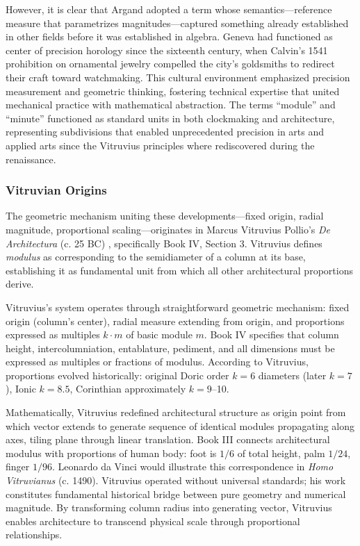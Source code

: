 However, it is clear that Argand adopted a term whose semantics—reference measure that parametrizes magnitudes—captured something already established in other fields before it was established in algebra. Geneva had functioned as center of precision horology since the sixteenth century, when Calvin's 1541 prohibition on ornamental jewelry compelled the city's goldsmiths to redirect their craft toward watchmaking. This cultural environment emphasized precision measurement and geometric thinking, fostering technical expertise that united mechanical practice with mathematical abstraction. The terms ``module'' and ``minute'' functioned as standard units in both clockmaking and architecture, representing subdivisions that enabled unprecedented precision in arts and applied arts since the Vitruvius principles where rediscovered during the renaissance.

\subsubsection{Vitruvian Origins}

The geometric mechanism uniting these developments—fixed origin, radial magnitude, proportional scaling—originates in Marcus Vitruvius Pollio's \textit{De Architectura} (c. 25 BC) \cite{Vitruvius}, specifically Book IV, Section 3. Vitruvius defines \textit{modulus} as corresponding to the semidiameter of a column at its base, establishing it as fundamental unit from which all other architectural proportions derive.

Vitruvius's system operates through straightforward geometric mechanism: fixed origin (column's center), radial measure extending from origin, and proportions expressed as multiples $k \cdot m$ of basic module $m$. Book IV specifies that column height, intercolumniation, entablature, pediment, and all dimensions must be expressed as multiples or fractions of modulus. According to Vitruvius, proportions evolved historically: original Doric order $k = 6$ diameters (later $k = 7$), Ionic $k = 8.5$, Corinthian approximately $k = 9$--10.

Mathematically, Vitruvius redefined architectural structure as origin point from which vector extends to generate sequence of identical modules propagating along axes, tiling plane through linear translation. Book III connects architectural modulus with proportions of human body: foot is $1/6$ of total height, palm $1/24$, finger $1/96$. Leonardo da Vinci would illustrate this correspondence in \textit{Homo Vitruvianus} (c. 1490). Vitruvius operated without universal standards; his work constitutes fundamental historical bridge between pure geometry and numerical magnitude. By transforming column radius into generating vector, Vitruvius enables architecture to transcend physical scale through proportional relationships.

